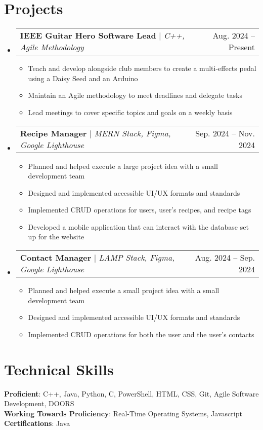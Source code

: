 \documentclass[letterpaper,11pt]{article}
\makeatletter
\newcommand{\resumeItem}[1]{
  \item\small{
    {#1 \vspace{-2pt}}
  }
}
\newcommand{\resumeProjectHeading}[2]{
    \item
    \begin{tabular*}{0.97\textwidth}{l@{\extracolsep{\fill}}r}
      \small#1 & #2 \\
    \end{tabular*}\vspace{-7pt}
}
\newcommand{\resumeSubHeadingListStart}{\begin{itemize}[leftmargin=0.15in, label={}]}
\newcommand{\resumeSubHeadingListEnd}{\end{itemize}}
\newcommand{\resumeItemListStart}{\begin{itemize}}
\newcommand{\resumeItemListEnd}{\end{itemize}\vspace{-5pt}}
\makeatother
\begin{document}
\section{Projects}
    \resumeSubHeadingListStart
      \resumeProjectHeading
          {\textbf{IEEE Guitar Hero Software Lead} $|$ \emph{C++, Agile Methodology}}{Aug. 2024 -- Present}
          \resumeItemListStart
            \resumeItem{Teach and develop alongside club members to create a multi-effects pedal using a Daisy Seed and an Arduino}
            \resumeItem{Maintain an Agile methodology to meet deadlines and delegate tasks}
            \resumeItem{Lead meetings to cover specific topics and goals on a weekly basis}
          \resumeItemListEnd
      \resumeProjectHeading
          {\textbf{Recipe Manager} $|$ \emph{MERN Stack, Figma, Google Lighthouse}}{Sep. 2024 -- Nov. 2024}
          \resumeItemListStart
            \resumeItem{Planned and helped execute a large project idea with a small development team}
            \resumeItem{Designed and implemented accessible UI/UX formats and standards}
            \resumeItem{Implemented CRUD operations for users, user's recipes, and recipe tags}
            \resumeItem{Developed a mobile application that can interact with the database set up for the website}
          \resumeItemListEnd
      \resumeProjectHeading
          {\textbf{Contact Manager} $|$ \emph{LAMP Stack, Figma, Google Lighthouse}}{Aug. 2024 -- Sep. 2024}
          \resumeItemListStart
            \resumeItem{Planned and helped execute a small project idea with a small development team}
            \resumeItem{Designed and implemented accessible UI/UX formats and standards}
            \resumeItem{Implemented CRUD operations for both the user and the user's contacts}
          \resumeItemListEnd
    \resumeSubHeadingListEnd

\section{Technical Skills}
 \begin{itemize}[leftmargin=0.15in, label={}]
    \small{\item{
     \textbf{Proficient}{: C++, Java, Python, C, PowerShell, HTML, CSS, Git, Agile Software Development, DOORS} \\
     \textbf{Working Towards Proficiency}{: Real-Time Operating Systems, Javascript} \\
     \textbf{Certifications}{: Java}
    }}
 \end{itemize}

\end{document}
